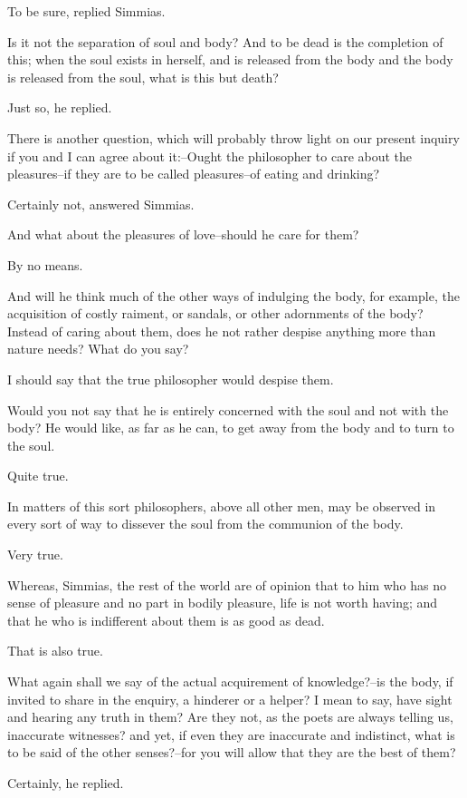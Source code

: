 To be sure, replied Simmias.

Is it not the separation of soul and body? And to be dead is the
completion of this; when the soul exists in herself, and is released
from the body and the body is released from the soul, what is this but
death?

Just so, he replied.

There is another question, which will probably throw light on our
present inquiry if you and I can agree about it:--Ought the philosopher
to care about the pleasures--if they are to be called pleasures--of
eating and drinking?

Certainly not, answered Simmias.

And what about the pleasures of love--should he care for them?

By no means.

And will he think much of the other ways of indulging the body, for
example, the acquisition of costly raiment, or sandals, or other
adornments of the body? Instead of caring about them, does he not rather
despise anything more than nature needs? What do you say?

I should say that the true philosopher would despise them.

Would you not say that he is entirely concerned with the soul and not
with the body? He would like, as far as he can, to get away from the
body and to turn to the soul.

Quite true.

In matters of this sort philosophers, above all other men, may be
observed in every sort of way to dissever the soul from the communion of
the body.

Very true.

Whereas, Simmias, the rest of the world are of opinion that to him who
has no sense of pleasure and no part in bodily pleasure, life is not
worth having; and that he who is indifferent about them is as good as
dead.

That is also true.

What again shall we say of the actual acquirement of knowledge?--is the
body, if invited to share in the enquiry, a hinderer or a helper? I mean
to say, have sight and hearing any truth in them? Are they not, as the
poets are always telling us, inaccurate witnesses? and yet, if even
they are inaccurate and indistinct, what is to be said of the other
senses?--for you will allow that they are the best of them?

Certainly, he replied.

